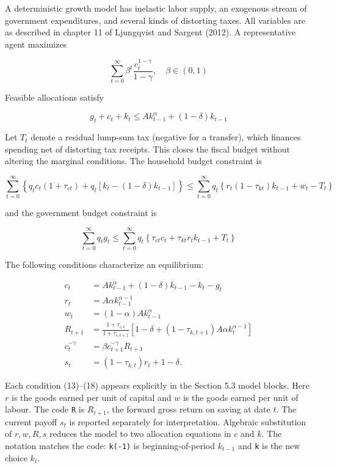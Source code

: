 \documentclass[12pt]{article}
\begin{document}
A deterministic growth model has inelastic labor supply, an exogenous stream of government expenditures, and several kinds of distorting taxes. All variables are as described in chapter 11 of Ljungqvist and Sargent (2012). A representative agent maximizes

$$
\sum_{t=0}^{\infty} \beta^{t} \frac{c_{t}^{1-\gamma}}{1-\gamma}, \quad \beta \in(0,1)
$$

Feasible allocations satisfy

$$
g_{t}+c_{t}+k_{t} \leq A k_{t-1}^{\alpha}+(1-\delta) k_{t-1}
$$

Let $T_t$ denote a residual lump-sum tax (negative for a transfer), which finances spending net of distorting tax receipts. This closes the fiscal budget without altering the marginal conditions. The household budget constraint is

$$
\sum_{t=0}^{\infty}\left\{q_{t} c_{t}\left(1+\tau_{c t}\right)+q_{t}\left[k_{t}-(1-\delta) k_{t-1}\right]\right\} \leq \sum_{t=0}^{\infty} q_{t}\left\{r_{t}\left(1-\tau_{k t}\right) k_{t-1}+w_{t}-T_t\right\}
$$

and the government budget constraint is

$$
\sum_{t=0}^{\infty} q_{t} g_{t} \leq \sum_{t=0}^{\infty} q_{t}\left\{\tau_{c t} c_{t}+\tau_{k t} r_{t} k_{t-1}+T_t\right\}
$$

The following conditions characterize an equilibrium:


\begin{align*}
c_t &= A k_{t-1}^\alpha+(1-\delta)k_{t-1}-k_{t}-g_t \tag{13}\\
r_t &= A\alpha k_{t-1}^{\alpha-1} \tag{14}\\
w_t &= (1-\alpha)A k_{t-1}^\alpha \tag{15}\\
R_{t+1} &= \frac{1+\tau_{c,t}}{1+\tau_{c,t+1}}
 \left[1-\delta+(1-\tau_{k,t+1})A\alpha k_{t}^{\alpha-1}\right] \tag{16}\\
c_t^{-\gamma} &= \beta c_{t+1}^{-\gamma}R_{t+1} \tag{17}\\
s_t &= (1-\tau_{k,t})r_t+1-\delta. \tag{18}
\end{align*}


Each condition (13)--(18) appears explicitly in the Section 5.3 model blocks. Here $r$ is the goods earned per unit of capital and $w$ is the goods earned per unit of labour. The code \texttt{R} is $R_{t+1}$, the forward gross return on saving at date $t$. The current payoff $s_t$ is reported separately for interpretation. Algebraic substitution of $r,w,R,s$ reduces the model to two allocation equations in $c$ and $k$. The notation matches the code: \texttt{k(-1)} is beginning-of-period $k_{t-1}$ and \texttt{k} is the new choice $k_t$.
\end{document}
